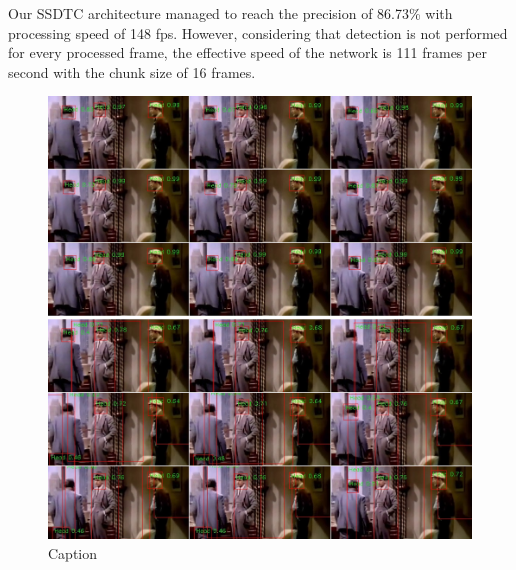 Our SSDTC architecture managed to reach the precision of 86.73\% with processing speed of 148 fps. However, considering that detection is not performed for every processed frame, the effective speed of the network is 111 frames per second with the chunk size of 16 frames. 
\begin{figure}
    \centering
    \includegraphics[width=\textwidth]{img/ssdt_ssdtc_comp}
    \caption{Caption}
    \label{fig:ssdssdtccomp}
\end{figure}